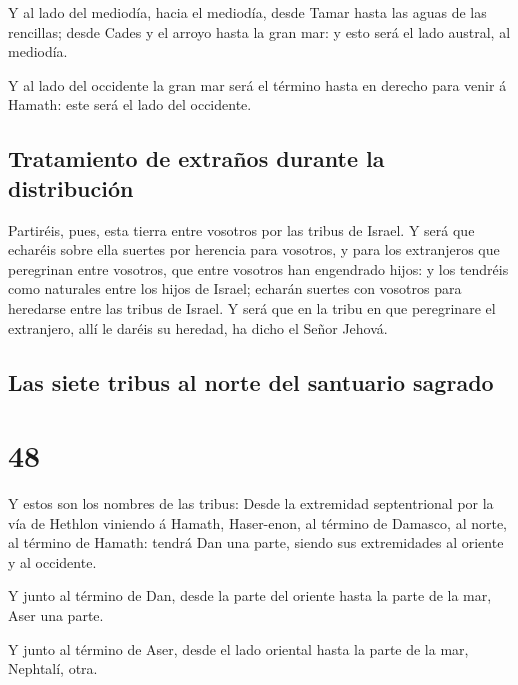  Y al lado del mediodía, hacia el mediodía, desde Tamar
hasta las aguas de las rencillas; desde Cades y el arroyo hasta la gran
mar: y esto será el lado austral, al mediodía.

 Y al lado del occidente la gran mar será el término
hasta en derecho para venir á Hamath: este será el lado del occidente.

\hypertarget{tratamiento-de-extrauxf1os-durante-la-distribuciuxf3n}{%
\subsection{Tratamiento de extraños durante la
distribución}\label{tratamiento-de-extrauxf1os-durante-la-distribuciuxf3n}}

 Partiréis, pues, esta tierra entre vosotros por las
tribus de Israel.  Y será que echaréis sobre ella suertes
por herencia para vosotros, y para los extranjeros que peregrinan entre
vosotros, que entre vosotros han engendrado hijos: y los tendréis como
naturales entre los hijos de Israel; echarán suertes con vosotros para
heredarse entre las tribus de Israel.  Y será que en la
tribu en que peregrinare el extranjero, allí le daréis su heredad, ha
dicho el Señor Jehová.

\hypertarget{las-siete-tribus-al-norte-del-santuario-sagrado}{%
\subsection{Las siete tribus al norte del santuario
sagrado}\label{las-siete-tribus-al-norte-del-santuario-sagrado}}

\hypertarget{section-26-48}{%
\section{48}\label{section-26-48}}

 Y estos son los nombres de las tribus: Desde la
extremidad septentrional por la vía de Hethlon viniendo á Hamath,
Haser-enon, al término de Damasco, al norte, al término de Hamath:
tendrá Dan una parte, siendo sus extremidades al oriente y al occidente.

 Y junto al término de Dan, desde la parte del oriente
hasta la parte de la mar, Aser una parte.

 Y junto al término de Aser, desde el lado oriental hasta
la parte de la mar, Nephtalí, otra.

